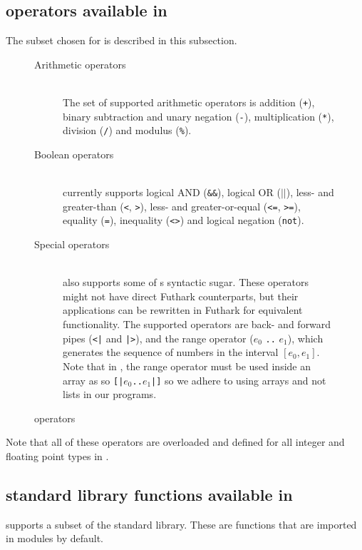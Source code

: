 \subsection*{\fsharp{} operators available in \fshark{}}
The \fsharp{} subset chosen for \fshark{} is described in this subsection.
\begin{figure}[h]
  \centering
\begin{description}
\item[Arithmetic operators]\hfill\\
  The set of supported arithmetic operators is addition (\texttt{+}),
  binary subtraction and unary negation (\texttt{-}), multiplication
  (\texttt{*}), division (\texttt{/}) and modulus (\texttt{\%}).
  
\item[Boolean operators]\hfill\\
  \fshark{} currently supports logical AND (\texttt{\&\&}), logical OR
  (\texttt{$||$}), less- and greater-than (\texttt{<}, \texttt{>}), less- and
  greater-or-equal (\texttt{<=}, \texttt{>=}), equality (\texttt{=}),
  inequality (\texttt{<>}) and logical negation (\texttt{not}).

\item[Special operators]\hfill\\
  \fshark{} also supports some of \fsharp{}s syntactic sugar. These operators
  might not have direct Futhark counterparts, but their applications can be
  rewritten in Futhark for equivalent functionality.
  The supported operators are back- and forward pipes (\texttt{<|} and
  \texttt{|>}), and the range operator ($e_0$ \texttt{..} $e_1$), which
  generates the sequence of numbers in the interval $[e_0,e_1]$. Note that in
  \fshark{}, the range operator must be used inside an array as so
  \texttt{[|$e_0$..$e_1$|]} so we adhere to using arrays and not lists in our
  \fshark{} programs.
\end{description}
  \caption{\fshark{} operators}
  \label{fig:fsharkops}
\end{figure}
Note that all of these operators are overloaded and defined for all integer
and floating point types in \fsharp{}.



\subsection*{\fsharp{} standard library functions available in \fshark{}}
\fshark{} supports a subset of the \fsharp{} standard library. These are
functions that are imported in \fsharp{} modules by default.

